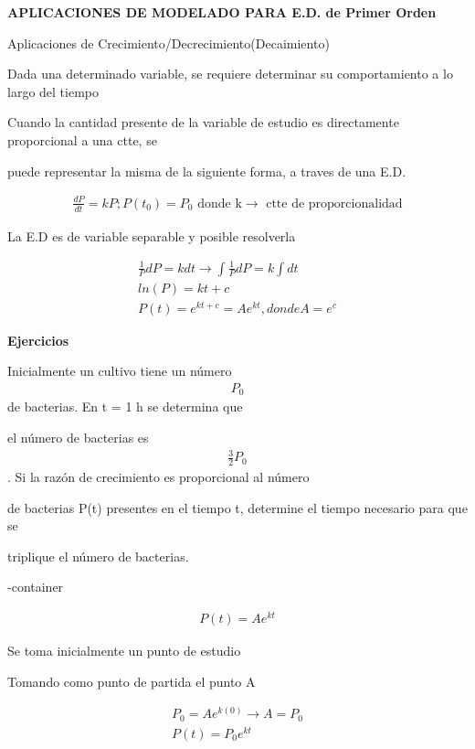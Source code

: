 \documentclass{article}
\begin{document}
\textbf{APLICACIONES DE MODELADO PARA E.D. de Primer Orden}



Aplicaciones de Crecimiento/Decrecimiento(Decaimiento)

Dada una determinado variable, se requiere determinar su comportamiento a lo largo del tiempo

Cuando la cantidad presente de la variable de estudio es directamente proporcional a una ctte,  se

puede representar la misma de la siguiente forma, a traves de una E.D.


\begin{gather*}
\frac{dP}{dt} = kP ;  P(t_{0}) = P_{0}\text{ donde k} \rightarrow \text{ ctte de proporcionalidad}
\end{gather*}


La E.D es de variable separable y posible resolverla


\begin{gather*}
\frac{1}{P}dP = kdt  \rightarrow  \int \frac{1}{P}dP = k\int dt \\
ln(P) = kt+c \\
P(t) = e^{kt+c}=Ae^{kt}, donde A=e^{c}
\end{gather*}


\textbf{Ejercicios}

Inicialmente un cultivo tiene un número 
\begin{gather*}
P_{0}
\end{gather*}
 de bacterias. En t = 1 h se determina que

el número de bacterias es 
\begin{gather*}
\frac{3}{2}P_{0}
\end{gather*}
. Si la razón de crecimiento es proporcional al número

de bacterias P(t) presentes en el tiempo t, determine el tiempo necesario para que se

triplique el número de bacterias.

\image-container


\begin{gather*}
P(t) =Ae^{kt}
\end{gather*}


Se toma inicialmente un punto de estudio

Tomando como punto de partida el \colorbox[RGB]{248,231,28}{punto A}


\begin{gather*}
P_{0} =Ae^{k(0)} \rightarrow    A=P_{0} \\
 P(t) =P_{0}e^{kt} 
\end{gather*}
\end{document}
